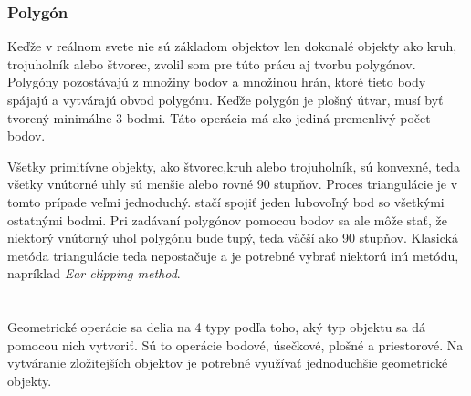 \subsection*{Polygón}
Keďže v reálnom svete nie sú základom objektov len dokonalé objekty ako kruh, trojuholník alebo štvorec, zvolil som pre túto prácu aj tvorbu polygónov. Polygóny pozostávajú z množiny bodov a množinou hrán, ktoré tieto body spájajú a vytvárajú obvod polygónu. Keďže polygón je plošný útvar, musí byť tvorený minimálne 3 bodmi. Táto operácia má ako jediná premenlivý počet bodov. 

Všetky primitívne objekty, ako štvorec,kruh alebo trojuholník, sú konvexné, teda všetky vnútorné uhly sú menšie alebo rovné 90 stupňov. Proces triangulácie je v tomto prípade veľmi jednoduchý. stačí spojiť jeden ľubovoľný bod so všetkými ostatnými bodmi. Pri zadávaní polygónov pomocou bodov sa ale môže stať, že niektorý vnútorný uhol polygónu bude tupý, teda väčší ako 90 stupňov. Klasická metóda triangulácie teda nepostačuje a je potrebné vybrať niektorú inú metódu, napríklad \textit{Ear clipping method}.



































\chapter{}
Geometrické operácie sa delia na 4 typy podľa toho, aký typ objektu sa dá pomocou nich vytvoriť. Sú to operácie bodové, úsečkové, plošné a priestorové. Na vytváranie zložitejších objektov je potrebné využívať jednoduchšie geometrické objekty. 


